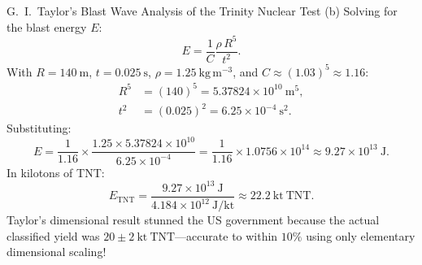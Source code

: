 \begin{workedexample}{G.~I.~Taylor's Blast Wave Analysis of the Trinity Nuclear Test}
(b) Solving for the blast energy $E$:
\[
E = \frac{1}{C}\frac{\rho\,R^5}{t^2}.
\]
With $R = 140\ \mathrm{m}$, $t = 0.025\ \mathrm{s}$, $\rho = 1.25\ \mathrm{kg\,m^{-3}}$, and $C \approx (1.03)^5 \approx 1.16$:
\begin{align*}
R^5 &= (140)^5 = 5.37824\times 10^{10}\ \mathrm{m^5}, \\
t^2 &= (0.025)^2 = 6.25\times 10^{-4}\ \mathrm{s^2}.
\end{align*}
Substituting:
\[
E = \frac{1}{1.16}\times\frac{1.25\times 5.37824\times 10^{10}}{6.25\times 10^{-4}} = \frac{1}{1.16}\times 1.0756\times 10^{14} \approx 9.27\times 10^{13}\ \mathrm{J}.
\]
In kilotons of TNT:
\[
E_{\text{TNT}} = \frac{9.27\times 10^{13}\ \mathrm{J}}{4.184\times 10^{12}\ \mathrm{J/kt}} \approx \mathbf{22.2\ \mathrm{kt\ TNT}.}
\]
Taylor's dimensional result stunned the US government because the actual classified yield was $20 \pm 2\ \mathrm{kt\ TNT}$---accurate to within $10\%$ using only elementary dimensional scaling!
\end{workedexample}

